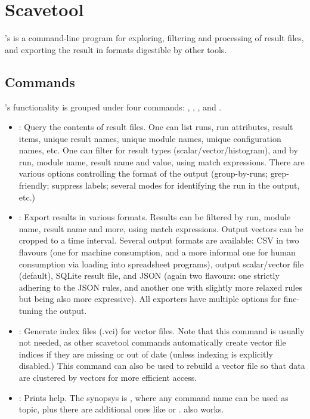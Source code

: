 

\section{Scavetool}
\label{sec:ana-sim:scavetool}

{\opp}'s  is a command-line program for exploring, filtering
and processing of result files, and exporting the result in formats
digestible by other tools.

\subsection{Commands}
\label{sec:ana-sim:scavetool:commands}

's functionality is grouped under four commands:
, , , and .

\begin{itemize}

\item {}: Query the contents of result files. One can list
    runs, run attributes, result items, unique result names, unique module
    names, unique configuration names, etc. One can filter for result types
    (scalar/vector/histogram), and by run, module name, result name and value,
    using match expressions. There are various options controlling the format
    of the output (group-by-runs; grep-friendly; suppress labels; several
    modes for identifying the run in the output, etc.)

\item {}: Export results in various formats. Results can be filtered
    by run, module name, result name and more, using match expressions. Output
    vectors can be cropped to a time interval. Several output formats are
    available: CSV in two flavours (one for machine consumption, and a more
    informal one for human consumption via loading into spreadsheet programs),
    {\opp} output scalar/vector file (default), {\opp} SQLite result file, and
    JSON (again two flavours: one strictly adhering to the JSON rules, and
    another one with slightly more relaxed rules but being also more
    expressive). All exporters have multiple options for fine-tuning the output.

\item {}: Generate index files (.vci) for vector files. Note that this
    command is usually not needed, as other scavetool commands automatically create
    vector file indices if they are missing or out of date (unless indexing is
    explicitly disabled.) This command can also be used to rebuild a vector file
    so that data are clustered by vectors for more efficient access.

\item {}: Prints help. The synopsys is ,
    where any command name can be used as topic, plus there are
    additional ones like  or .  also works.

\end{itemize}

